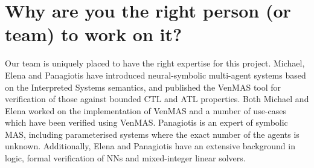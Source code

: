\documentclass[11pt]{article}
\begin{document}
\begin{center}
\end{center}

\section{Why are you the right person (or
team) to work on it?}


Our team is uniquely placed to have the right expertise for this
project. Michael, Elena and Panagiotis have introduced neural-symbolic
multi-agent systems based on the Interpreted Systems semantics, and
published the VenMAS tool for verification of those against bounded
CTL and ATL properties.  Both Michael and Elena worked on the
implementation of VenMAS and a number of use-cases which have been
verified using VenMAS.  Panagiotis is an expert of symbolic MAS,
including parameterised systems where the exact number of the agents
is unknown.  Additionally, Elena and Panagiotis have an extensive
background in logic, formal verification of NNs and mixed-integer
linear solvers.
\end{document}
